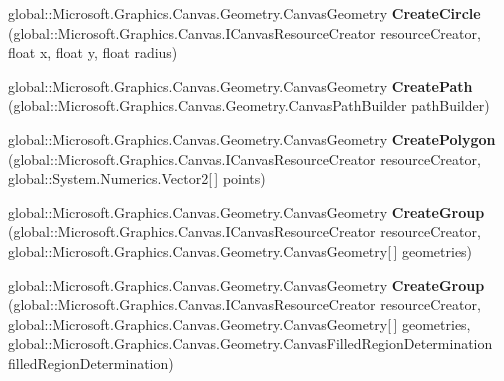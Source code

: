 \begin{DoxyCompactItemize}
\item 
\mbox{\label{interface_microsoft_1_1_graphics_1_1_canvas_1_1_geometry_1_1_i_canvas_geometry_statics_a451b4303daecd5545b17b3e57305e02f}} 
global\+::\+Microsoft.\+Graphics.\+Canvas.\+Geometry.\+Canvas\+Geometry {\bfseries Create\+Circle} (global\+::\+Microsoft.\+Graphics.\+Canvas.\+I\+Canvas\+Resource\+Creator resource\+Creator, float x, float y, float radius)
\item 
\mbox{\label{interface_microsoft_1_1_graphics_1_1_canvas_1_1_geometry_1_1_i_canvas_geometry_statics_a9b464d06c47609c3d62de903eb4c611e}} 
global\+::\+Microsoft.\+Graphics.\+Canvas.\+Geometry.\+Canvas\+Geometry {\bfseries Create\+Path} (global\+::\+Microsoft.\+Graphics.\+Canvas.\+Geometry.\+Canvas\+Path\+Builder path\+Builder)
\item 
\mbox{\label{interface_microsoft_1_1_graphics_1_1_canvas_1_1_geometry_1_1_i_canvas_geometry_statics_aad896d1f9173e8b37733e3174e9e0321}} 
global\+::\+Microsoft.\+Graphics.\+Canvas.\+Geometry.\+Canvas\+Geometry {\bfseries Create\+Polygon} (global\+::\+Microsoft.\+Graphics.\+Canvas.\+I\+Canvas\+Resource\+Creator resource\+Creator, global\+::\+System.\+Numerics.\+Vector2\mbox{[}$\,$\mbox{]} points)
\item 
\mbox{\label{interface_microsoft_1_1_graphics_1_1_canvas_1_1_geometry_1_1_i_canvas_geometry_statics_af80ea6b6f5c0b36d0284b7ea487eaafd}} 
global\+::\+Microsoft.\+Graphics.\+Canvas.\+Geometry.\+Canvas\+Geometry {\bfseries Create\+Group} (global\+::\+Microsoft.\+Graphics.\+Canvas.\+I\+Canvas\+Resource\+Creator resource\+Creator, global\+::\+Microsoft.\+Graphics.\+Canvas.\+Geometry.\+Canvas\+Geometry\mbox{[}$\,$\mbox{]} geometries)
\item 
\mbox{\label{interface_microsoft_1_1_graphics_1_1_canvas_1_1_geometry_1_1_i_canvas_geometry_statics_a12df4abd73ae08fddb2cd7e68c84a78b}} 
global\+::\+Microsoft.\+Graphics.\+Canvas.\+Geometry.\+Canvas\+Geometry {\bfseries Create\+Group} (global\+::\+Microsoft.\+Graphics.\+Canvas.\+I\+Canvas\+Resource\+Creator resource\+Creator, global\+::\+Microsoft.\+Graphics.\+Canvas.\+Geometry.\+Canvas\+Geometry\mbox{[}$\,$\mbox{]} geometries, global\+::\+Microsoft.\+Graphics.\+Canvas.\+Geometry.\+Canvas\+Filled\+Region\+Determination filled\+Region\+Determination)

\end{DoxyCompactItemize}
